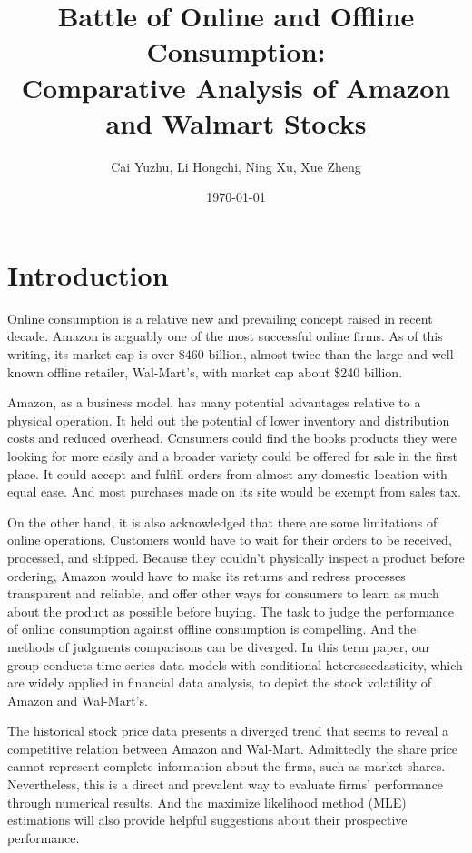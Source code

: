 \documentclass[paper=a4, fontsize=11pt]{article}
\title{
\normalfont \normalsize
\huge Battle of Online and Offline Consumption: \\
Comparative Analysis of Amazon and Walmart Stocks
}
\author{Cai Yuzhu, Li Hongchi, Ning Xu, Xue Zheng}
\date{\normalsize\today}
\begin{document}
\maketitle

\section{Introduction}
Online consumption is a relative new and prevailing concept raised in recent decade. Amazon is arguably one of the most successful online firms. As of this writing, its market cap is over \$460 billion, almost twice than the large and well-known offline retailer, Wal-Mart's, with market cap about \$240 billion.

Amazon, as a business model, has many potential advantages relative to a physical operation. It held out the potential of lower inventory and distribution costs and reduced overhead. Consumers could find the books products they were looking for more easily and a broader variety could be offered for sale in the first place. It could accept and fulfill orders from almost any domestic location with equal ease. And most purchases made on its site would be exempt from sales tax.

On the other hand, it is also acknowledged that there are some limitations of online operations. Customers would have to wait for their orders to be received, processed, and shipped. Because they couldn't physically inspect a product before ordering, Amazon would have to make its returns and redress processes transparent and reliable, and offer other ways for consumers to learn as much about the product as possible before buying.
The task to judge the performance of online consumption against offline consumption is compelling. And the methods of judgments comparisons can be diverged. In this term paper, our group conducts time series data models with conditional heteroscedasticity, which are widely applied in financial data analysis, to depict the stock volatility of Amazon and Wal-Mart's.

The historical stock price data presents a diverged trend that seems to reveal a competitive relation between Amazon and Wal-Mart. Admittedly the share price cannot represent complete information about the firms, such as market shares. Nevertheless, this is a direct and prevalent way to evaluate firms' performance through numerical results. And the maximize likelihood method (MLE) estimations will also provide helpful suggestions about their prospective performance.
\end{document}
